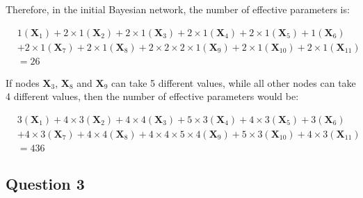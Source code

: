 \documentclass[11pt,fancychapters]{article}
\begin{document}
Therefore, in the initial Bayesian network, the number of effective parameters is:

\begin{align*}
	&1(\mathbf{X}_1) + 2 \times 1(\mathbf{X}_2) + 2 \times 1(\mathbf{X}_3) + 2 \times 1(\mathbf{X}_4) + 2 \times 1(\mathbf{X}_5) + 1(\mathbf{X}_6) \\ &+ 2 \times 1(\mathbf{X}_7) + 2 \times 1(\mathbf{X}_8) + 2 \times 2 \times 2 \times 1(\mathbf{X}_9) + 2 \times 1(\mathbf{X}_{10}) + 2 \times 1(\mathbf{X}_{11}) \\ &= 26
\end{align*}

If nodes $\mathbf{X}_3$, $\mathbf{X}_8$ and $\mathbf{X}_9$ can take 5 different values, while all other nodes can take 4 different values, then the number of effective parameters would be:

\begin{align*}
	&3(\mathbf{X}_1) + 4 \times 3(\mathbf{X}_2) + 4 \times 4(\mathbf{X}_3) + 5 \times 3(\mathbf{X}_4) + 4 \times 3(\mathbf{X}_5) + 3(\mathbf{X}_6) \\ &+ 4 \times 3(\mathbf{X}_7) + 4 \times 4(\mathbf{X}_8) + 4 \times 4 \times 5 \times 4(\mathbf{X}_9) + 5 \times 3(\mathbf{X}_{10}) + 4 \times 3(\mathbf{X}_{11}) \\ &= 436
\end{align*}

\subsection*{Question 3}
\end{document}
